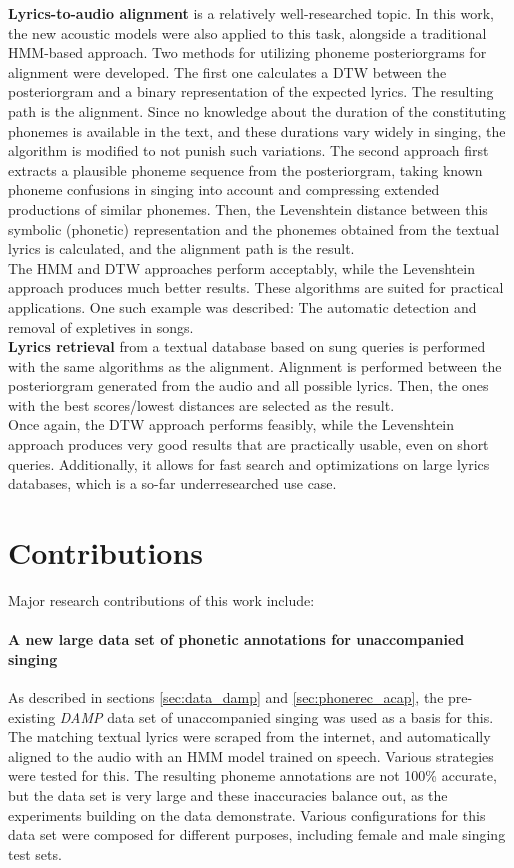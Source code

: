 \textbf{Lyrics-to-audio alignment} is a relatively well-researched topic. In this work, the new acoustic models were also applied to this task, alongside a traditional HMM-based approach. Two methods for utilizing phoneme posteriorgrams for alignment were developed. The first one calculates a DTW between the posteriorgram and a binary representation of the expected lyrics. The resulting path is the alignment. Since no knowledge about the duration of the constituting phonemes is available in the text, and these durations vary widely in singing, the algorithm is modified to not punish such variations. The second approach first extracts a plausible phoneme sequence from the posteriorgram, taking known phoneme confusions in singing into account and compressing extended productions of similar phonemes. Then, the Levenshtein distance between this symbolic (phonetic) representation and the phonemes obtained from the textual lyrics is calculated, and the alignment path is the result.\\
The HMM and DTW approaches perform acceptably, while the Levenshtein approach produces much better results. These algorithms are suited for practical applications. One such example was described: The automatic detection and removal of expletives in songs.\\

\textbf{Lyrics retrieval} from a textual database based on sung queries is performed with the same algorithms as the alignment. Alignment is performed between the posteriorgram generated from the audio and all possible lyrics. Then, the ones with the best scores/lowest distances are selected as the result.\\
Once again, the DTW approach performs feasibly, while the Levenshtein approach produces very good results that are practically usable, even on short queries. Additionally, it allows for fast search and optimizations on large lyrics databases, which is a so-far underresearched use case.

\section{Contributions}


Major research contributions of this work include:

\paragraph{A new large data set of phonetic annotations for unaccompanied singing}
As described in sections \ref{sec:data_damp} and \ref{sec:phonerec_acap}, the pre-existing \textit{DAMP} data set of unaccompanied singing was used as a basis for this. The matching textual lyrics were scraped from the internet, and automatically aligned to the audio with an HMM model trained on speech. Various strategies were tested for this. The resulting phoneme annotations are not 100\% accurate, but the data set is very large and these inaccuracies balance out, as the experiments building on the data demonstrate. Various configurations for this data set were composed for different purposes, including female and male singing test sets.

